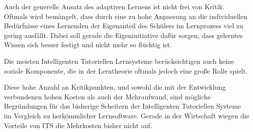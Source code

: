 Auch der generelle Ansatz des adaptiven Lernens ist nicht frei von Kritik. Oftmals wird bemängelt, dass durch eine
zu hohe Anpassung an die individuellen Bedürfnisse eines Lernenden der Eigenanteil des Schülers
im Lernprozess viel zu gering ausfällt. Dabei soll gerade die Eigeninitiative
dafür sorgen, dass gelerntes Wissen sich besser festigt und nicht mehr so flüchtig ist.

Die meisten Intelligenten Tutoriellen Lernsysteme berücksichtigen auch keine soziale Komponente, die in der Lerntheorie
oftmals jedoch eine große Rolle spielt.

Diese hohe Anzahl an Kritikpunkten, und sowohl die mit der Entwicklung verbundenen hohen Kosten als auch der Mehraufwand,
sind mögliche Begründungen für das bisherige Scheitern der Intelligenten Tutoriellen Systeme im Vergleich
zu herkömmlicher Lernsoftware. Gerade in der Wirtschaft wiegen die Vorteile von ITS die Mehrkosten bisher nicht auf.
